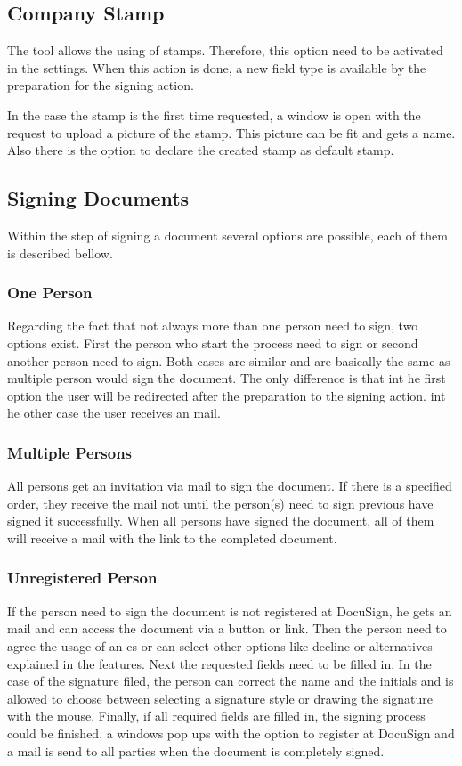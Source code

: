 \subsection{Company Stamp}
The tool allows the using of stamps. Therefore, this option need to be activated in the settings. When this action is done, a new field type is available by the preparation for the signing action.

In the case the stamp is the first time requested, a window is open with the request to upload a picture of the stamp. This picture can be fit and gets a name. Also there is the option to declare the created stamp as default stamp. 

\subsection{Signing Documents}
Within the step of signing a document several options are possible, each of them is described bellow.

\subsubsection{One Person}
Regarding the fact that not always more than one person need to sign, two options exist. First the person who start the process need to sign or second another person need to sign. Both cases are similar and are basically the same as multiple person would sign the document. The only difference is that int he first option the user will be redirected after the preparation to the signing action. int he other case the user receives an mail. 

\subsubsection{Multiple Persons}
All persons get an invitation via mail to sign the document. If there is a specified order, they receive the mail not until the person(s) need to sign previous have signed it successfully. When all persons have signed the document, all of them will receive a mail with the link to the completed document.

\subsubsection{Unregistered Person}
If the person need to sign the document is not registered at DocuSign, he gets an mail and can access the document via a button or link. Then the person need to agree the usage of an \gls{es} or can select other options like decline or alternatives explained in the features. Next the requested fields need to be filled in. In the case of the signature filed, the person can correct the name and the initials and is allowed to choose between selecting a signature style or drawing the signature with the mouse. Finally, if all required fields are filled in, the signing process could be finished, a windows pop ups with the option to register at DocuSign and a mail is send to all parties when the document is completely signed. 

